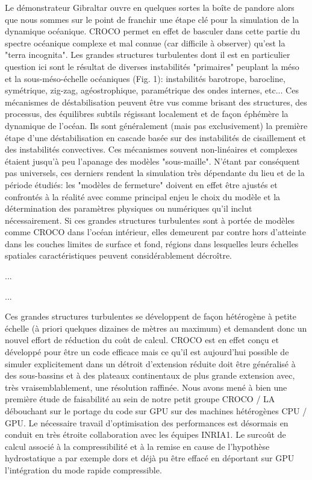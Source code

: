 Le démonstrateur Gibraltar ouvre en quelques sortes la boîte de pandore alors que nous sommes sur le point de franchir une étape clé pour la simulation de la dynamique océanique. CROCO permet en effet de basculer dans cette partie du spectre océanique complexe et mal connue (car difficile à observer) qu'est la "terra incognita". Les grandes structures turbulentes dont il est en particulier question ici sont le résultat de diverses instabilités "primaires" peuplant la méso et la sous-méso-échelle océaniques (Fig. 1): instabilités barotrope, barocline, symétrique, zig-zag, agéostrophique, paramétrique des ondes internes, etc... Ces mécanismes de déstabilisation peuvent être vus comme brisant des structures, des processus, des équilibres subtils régissant localement et de façon éphémère la dynamique de l'océan. Ils sont généralement (mais pas exclusivement) la première étape d'une déstabilisation en cascade basée sur des instabilités de cisaillement et des instabilités convectives. Ces mécanismes souvent non-linéaires et complexes étaient jusqu'à peu l'apanage des modèles "sous-maille". N'étant par conséquent pas universels, ces derniers rendent la simulation très dépendante du lieu et de la période étudiés: les "modèles de fermeture" doivent en effet être ajustés et confrontés à la réalité avec comme principal enjeu le choix du modèle et la détermination des paramètres physiques ou numériques qu’il inclut nécessairement. Si ces grandes structures turbulentes sont à portée de modèles comme CROCO dans l’océan intérieur, elles demeurent par contre hors d’atteinte dans les couches limites de surface et fond, régions dans lesquelles leurs échelles spatiales caractéristiques peuvent considérablement décroître.

...


...

Ces grandes structures turbulentes se développent de façon hétérogène à petite échelle (à priori quelques dizaines de mètres au maximum) et demandent donc un nouvel effort de réduction du coût de calcul. CROCO est en effet conçu et développé pour être un code efficace mais ce qu'il est aujourd'hui possible de simuler explicitement dans un détroit d'extension réduite doit être généralisé à des sous-bassins et à des plateaux continentaux de plus grande extension avec, très vraisemblablement, une résolution raffinée. Nous avons mené à bien une première étude de faisabilité au sein de notre petit groupe CROCO / LA débouchant sur le portage du code sur GPU sur des machines hétérogènes CPU / GPU. Le nécessaire travail d’optimisation des performances est désormais en conduit en très étroite collaboration avec les équipes INRIA1. Le surcoût de calcul associé à la compressibilité et à la remise en cause de l'hypothèse hydrostatique a par exemple dors et déjà pu être effacé en déportant sur GPU l'intégration du mode rapide compressible.


